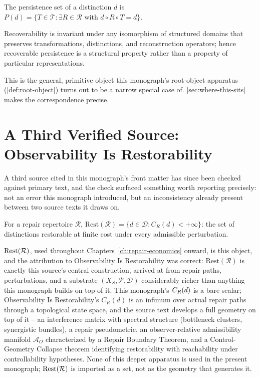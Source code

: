 \begin{definition}
\label{def:persistence-set}
The persistence set of a distinction $d$ is $P(d) = \{T \in \mathcal{T} :
\exists R \in \mathcal{R} \text{ with } d \circ R \circ T = d\}$.
\end{definition}

\begin{theorem}
\label{thm:persistence-structural}
Recoverability is invariant under any isomorphism of structured domains that
preserves transformations, distinctions, and reconstruction operators; hence
recoverable persistence is a structural property rather than a property of
particular representations.
\end{theorem}

This is the general, primitive object this monograph's root-object apparatus
(\cref{def:root-object}) turns out to be a narrow special case of.
\cref{sec:where-this-sits} makes the correspondence precise.

\section{A Third Verified Source: Observability Is Restorability}
\label{sec:oir}


A third source cited in this monograph's front matter has since been checked
against primary text, and the check surfaced something worth reporting
precisely: not an error this monograph introduced, but an inconsistency
already present between two source texts it draws on.

\begin{definition}
\label{def:rest-oir}
For a repair repertoire $\mathcal{R}$, $\mathrm{Rest}(\mathcal{R}) = \{d \in
\mathcal{D} : C_R(d) < +\infty\}$: the set of distinctions restorable at
finite cost under every admissible perturbation.
\end{definition}

$\mathrm{Rest}(\mathcal{R})$, used throughout Chapters~\ref{ch:repair-economics} onward, is
this object, and the attribution to Observability Is Restorability was
correct: $\mathrm{Rest}(\mathcal{R})$ is exactly this source's central
construction, arrived at from repair paths, perturbations, and a
substrate $(X_S, \mathcal{P}, \mathcal{D})$ considerably richer than
anything this monograph builds on top of it. This monograph's $C_R(d)$
is a bare scalar; Observability Is Restorability's $C_R(d)$ is an infimum
over actual repair paths through a topological state space, and the source
text develops a full geometry on top of it -- an interference matrix with
spectral structure (bottleneck clusters, synergistic bundles), a repair
pseudometric, an observer-relative admissibility manifold $\mathcal{A}_O$
characterized by a Repair Boundary Theorem, and a Control-Geometry
Collapse theorem identifying restorability with reachability under
controllability hypotheses. None of this deeper apparatus is used in the
present monograph; $\mathrm{Rest}(\mathcal{R})$ is imported as a set, not as the geometry
that generates it.

